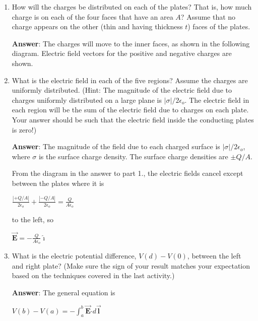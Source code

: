 \documentclass{article}
\newcommand{\ds}[0]{\displaystyle}
\newcommand{\ihat}[0]{\hat{\boldsymbol{\imath}}}
\newcommand{\bfvec}[1]{\vec{\mathbf{#1}}}
\newcommand{\bfcdot}[0]{\boldsymbol{\cdot}}
\begin{document}
\begin{enumerate}

  \item How will the charges be distributed on each of the plates? That is, how much charge is on each of the four faces that have an area $A$? Assume that no charge appears on the other (thin and having thickness $t$) faces of the plates.

        \ifsolutions
        {\bf Answer}: The charges will move to the inner faces, as shown in the following diagram. Electric field vectors for the positive and negative charges are shown.

        
        \else
        \vskip 36pt
        \fi

  \item What is the electric field in each of the five regions? Assume the charges are uniformly distributed. (Hint: The magnitude of the electric field due to charges uniformly distributed on a large plane is $|\sigma|/2\epsilon_o$. The electric field in each region will be the sum of the electric field due to charges on each plate. Your answer should be such that the electric field inside the conducting plates is zero!)

        \ifsolutions
        {\bf Answer}: The magnitude of the field due to each charged surface is $|\sigma|/2\epsilon_o$, where $\sigma$ is the surface charge density. The surface charge densities are $\pm Q/A$.

        

        From the diagram in the answer to part 1., the electric fields cancel except between the plates where it is 

        $\ds\frac{|+Q/A|}{2\epsilon_o} + \frac{|-Q/A|}{2\epsilon_o} = \frac{Q}{A\epsilon_o}$

        to the left, so

        $\ds\bfvec{E}=-\frac{Q}{A\epsilon_o}\ihat$
        \else
        \vskip 36pt
        \fi

  \item What is the electric potential difference, $V(d)-V(0)$, between the left and right plate? (Make sure the sign of your result matches your expectation based on the techniques covered in the last activity.)

        \ifsolutions
        {\bf Answer}: The general equation is

        $\ds V(b)-V(a) = -\int_a^b\bfvec{E}\bfcdot d\bfvec{l}$


\end{enumerate}
\end{document}
